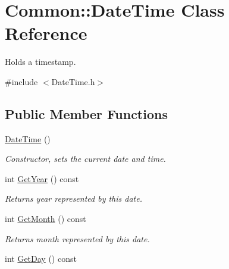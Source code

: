 \hypertarget{class_common_1_1_date_time}{\section{Common\-:\-:Date\-Time Class Reference}
\label{class_common_1_1_date_time}
}


Holds a timestamp.  




{\ttfamily \#include $<$Date\-Time.\-h$>$}

\subsection*{Public Member Functions}
\begin{DoxyCompactItemize}
\item 
\hypertarget{class_common_1_1_date_time_a3ccfb87f7a2e9683b91964e32d907161}{\hyperlink{class_common_1_1_date_time_a3ccfb87f7a2e9683b91964e32d907161}{Date\-Time} ()}\label{class_common_1_1_date_time_a3ccfb87f7a2e9683b91964e32d907161}

\begin{DoxyCompactList}\small\item\em Constructor, sets the current date and time. \end{DoxyCompactList}\item 
\hypertarget{class_common_1_1_date_time_aba159de639cf43c4191110eb6e5bba25}{int \hyperlink{class_common_1_1_date_time_aba159de639cf43c4191110eb6e5bba25}{Get\-Year} () const }\label{class_common_1_1_date_time_aba159de639cf43c4191110eb6e5bba25}

\begin{DoxyCompactList}\small\item\em Returns year represented by this date. \end{DoxyCompactList}\item 
\hypertarget{class_common_1_1_date_time_abf791831b6d7be2d505425e03b802c9c}{int \hyperlink{class_common_1_1_date_time_abf791831b6d7be2d505425e03b802c9c}{Get\-Month} () const }\label{class_common_1_1_date_time_abf791831b6d7be2d505425e03b802c9c}

\begin{DoxyCompactList}\small\item\em Returns month represented by this date. \end{DoxyCompactList}\item 
\hypertarget{class_common_1_1_date_time_a5cf339c1158f5f95bff6e7c2f556c057}{int \hyperlink{class_common_1_1_date_time_a5cf339c1158f5f95bff6e7c2f556c057}{Get\-Day} () const }\label{class_common_1_1_date_time_a5cf339c1158f5f95bff6e7c2f556c057}


\end{DoxyCompactItemize}
